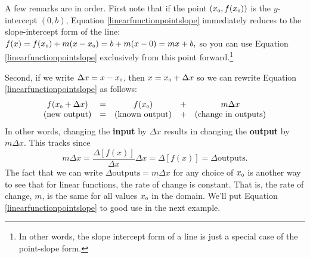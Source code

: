 \documentclass{ximera}
\begin{document}
A few remarks are in order.  First note that if the point $(x_{\mbox{\tiny $0$}}, f(x_{\mbox{\tiny $0$}}))$ is the $y$-intercept $(0, b)$, Equation \ref{linearfunctionpointslope} immediately reduces to the slope-intercept form of the line: $ f(x) = f(x_{\mbox{\tiny $0$}}) + m (x - x_{\mbox{\tiny $0$}})  = b + m(x - 0) = mx + b,$ so you can use Equation \ref{linearfunctionpointslope} exclusively from this point forward.\footnote{In other words, the slope intercept form of a line is just a special case of the point-slope form.}



Second, if we write $\Delta x = x - x_{\mbox{\tiny $0$}}$, then  $x = x_{\mbox{\tiny $0$}} + \Delta x$  so we can rewrite Equation \ref{linearfunctionpointslope}  as follows: \[ \begin{array}{ccccc}
 f(x_{\mbox{\tiny $0$}} + \Delta x) & = & f(x_{\mbox{\tiny $0$}}) & + & m \Delta x \\
 (\text{new output}) & = & (\text{known output}) & +&  (\text{change in outputs}) \\ \end{array} \] In other words, changing the \textbf{input} by $\Delta x$ results in changing the \textbf{output} by $m \Delta x$.  This tracks since \[ m \Delta x  = \dfrac{\Delta [f(x)]}{\Delta x} \Delta x =  \Delta[f(x)]  = \Delta \text{outputs}. \] The fact that we can write $\Delta \text{outputs} = m \Delta x$ for any choice of $x_{\mbox{\tiny $0$}}$ is another way to see that for linear functions, the rate of change is constant.  That is, the rate of change, $m$,  is the same for all values $x_{\mbox{\tiny $0$}}$ in the domain. We'll put Equation \ref{linearfunctionpointslope} to good use in the next example.
 
\end{document}
